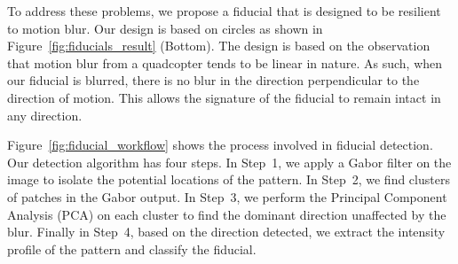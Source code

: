 To address these problems, we propose a fiducial that is designed to be
resilient to motion blur. Our design is based on circles as shown in
Figure~\ref{fig:fiducials_result} (Bottom). The design is based on the
observation that motion blur from a quadcopter tends to be linear in nature. As
such, when our fiducial is blurred, there is no blur in the direction
perpendicular to the direction of motion. This allows the signature of the
fiducial to remain intact in any direction.

Figure~\ref{fig:fiducial_workflow} shows the process involved in fiducial
detection. Our detection algorithm has four steps. In Step~1, we apply a Gabor
filter on the image to isolate the potential locations of the pattern.  In
Step~2, we find clusters of patches in the Gabor output.  In Step~3, we perform
the Principal Component Analysis (PCA) on each cluster to find the dominant
direction unaffected by the blur.  Finally in Step~4, based on the
direction detected, we extract the intensity profile of the pattern
and classify the fiducial.


